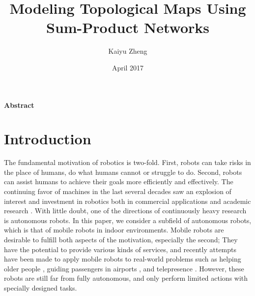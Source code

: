 \documentclass[10pt, titlepage]{article}
\title{Modeling Topological Maps Using Sum-Product Networks}
\author{Kaiyu Zheng}
\date{April 2017}
\theoremstyle{definition}
\begin{document}


\newpage

\newpage
{} %
\begin{center}\Large \textbf{Abstract}\normalsize\end{center}



\newpage
\tableofcontents
 
\newpage
{} %
\section{Introduction}
The fundamental motivation of robotics is two-fold. First, robots can take risks in the place of humans, do what humans cannot or struggle to do. Second, robots can assist humans to achieve their goals more efficiently and effectively. The continuing favor of machines in the last several decades saw an explosion of interest and investment in robotics both in commercial applications and academic research \cite{pagliarini2017future}. With little doubt, one of the directions of continuously heavy research is autonomous robots. In this paper, we consider a subfield of autonomous robots, which is that of mobile robots in indoor environments. Mobile robots are desirable to fulfill both aspects of the motivation, especially the second; They have the potential to provide various kinds of services, and recently attempts have been made to apply mobile robots to real-world problems such as helping older people \cite{jayawardena2010deployment}, guiding passengers in airports \cite{triebel2016spencer}, and telepresence \cite{matsuda2016scalablebody}. However, these robots are still far from fully autonomous, and only perform limited actions with specially designed tasks.
\end{document}
